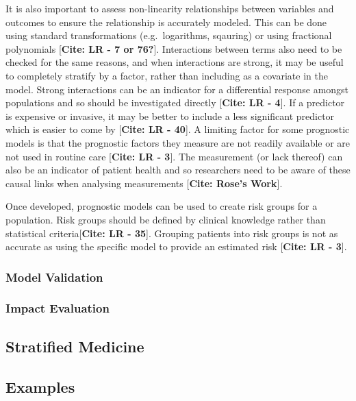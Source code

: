 \documentclass[12pt,PhD,twoside,openright]{muthesis}
\begin{document}
It is also important to assess non-linearity relationships between variables and outcomes to ensure the relationship is accurately modeled. This can be done using standard transformations (e.g.~logarithms, sqauring) or using fractional polynomials {[}\textbf{Cite: LR - 7 or 76?}{]}. Interactions between terms also need to be checked for the same reasons, and when interactions are strong, it may be useful to completely stratify by a factor, rather than including as a covariate in the model. Strong interactions can be an indicator for a differential response amongst populations and so should be investigated directly {[}\textbf{Cite: LR - 4}{]}. If a predictor is expensive or invasive, it may be better to include a less significant predictor which is easier to come by {[}\textbf{Cite: LR - 40}{]}. A limiting factor for some prognostic models is that the prognostic factors they measure are not readily available or are not used in routine care {[}\textbf{Cite: LR - 3}{]}. The measurement (or lack thereof) can also be an indicator of patient health and so researchers need to be aware of these causal links when analysing measurements {[}\textbf{Cite: Rose's Work}{]}.

Once developed, prognostic models can be used to create risk groups for a population. Risk groups should be defined by clinical knowledge rather than statistical criteria{[}\textbf{Cite: LR - 35}{]}. Grouping patients into risk groups is not as accurate as using the specific model to provide an estimated risk {[}\textbf{Cite: LR - 3}{]}.

\hypertarget{model-validation}{%
\subsubsection{Model Validation}\label{model-validation}}

\hypertarget{impact-evaluation}{%
\subsubsection{Impact Evaluation}\label{impact-evaluation}}

\hypertarget{stratified-medicine}{%
\subsection{Stratified Medicine}\label{stratified-medicine}}

\hypertarget{examples}{%
\subsection{Examples}\label{examples}}
\end{document}
